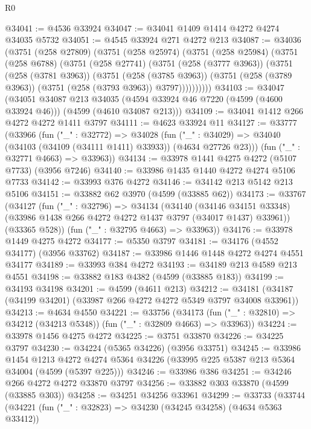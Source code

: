 \begin{lexlean}{R0}
\begin{coremodule}
@34041 := @4536 @33924
@34047 := @34041 @1409 @1414 @4272 @4274 @34035 @5732
@34051 := @4545 @33924 @271 @4272 @213
@34087 := @34036
    (@3751
      (@258 @27809)
      (@3751
        (@258 @25974)
        (@3751
          (@258 @25984)
          (@3751
            (@258 @6788)
            (@3751
              (@258 @27741)
              (@3751
                (@258 (@3777 @3963))
                (@3751
                  (@258 (@3781 @3963))
                  (@3751
                    (@258 (@3785 @3963))
                    (@3751 (@258 (@3789 @3963)) (@3751 (@258 (@3793 @3963)) @3797))))))))))
@34103 := @34047
    (@34051
      @34087
      @213
      @34035
      (@4594 @33924 @46 @7220 (@4599 (@4600 @33924 @46)))
      (@4599 (@4610 @34087 @213)))
@34109 := @34041 @1412 @266 @4272 @4272 @1411 @3797
@34111 := @4623 @33924 @11
@34127 := @33777
    (@33966
      (fun ("_" : @32772) =>
      @34028
        (fun ("_" : @34029) => @34040 (@34103 (@34109 (@34111 @1411) @33933)) (@4634 @27726 @23)))
      (fun ("_" : @32771 @4663) => @33963))
@34134 := @33978 @1441 @4275 @4272 (@5107 @7733) (@3956 @7246)
@34140 := @33986 @1435 @1440 @4272 @4274 @5106 @7733
@34142 := @33993 @376 @4272
@34146 := @34142 @213 @5142 @213 @5106
@34151 := @33882 @62 @3970 (@4599 (@33885 @62))
@34173 := @33767
    (@34127
      (fun ("_" : @32796) =>
      @34134
        (@34140
          (@34146 @34151 @33348)
          (@33986 @1438 @266 @4272 @4272 @1437 @3797 (@34017 @1437) @33961))
        (@33365 @528))
      (fun ("_" : @32795 @4663) => @33963))
@34176 := @33978 @1449 @4275 @4272
@34177 := @5350 @3797
@34181 := @34176 (@4552 @34177) (@3956 @33762)
@34187 := @33986 @1446 @1448 @4272 @4274 @4551 @34177
@34189 := @33993 @384 @4272
@34193 := @34189 @213 @4589 @213 @4551
@34198 := @33882 @183 @4382 (@4599 (@33885 @183))
@34199 := @34193 @34198
@34201 := @4599 (@4611 @213)
@34212 := @34181 (@34187 (@34199 @34201) (@33987 @266 @4272 @4272 @5349 @3797 @34008 @33961))
@34213 := @4634 @4550
@34221 := @33756
    (@34173 (fun ("_" : @32810) => @34212 (@34213 @5348)) (fun ("_" : @32809 @4663) => @33963))
@34224 := @33978 @1456 @4275 @4272
@34225 := @3751 @33870
@34226 := @34225 @3797
@34230 := @34224 (@5365 @34226) (@3956 @33751)
@34245 := @33986
    @1454
    @1213
    @4272
    @4274
    @5364
    @34226
    (@33995 @225 @5387 @213 @5364 @34004 (@4599 (@5397 @225)))
@34246 := @33986 @386
@34251 := @34246 @266 @4272 @4272 @33870 @3797
@34256 := @33882 @303 @33870 (@4599 (@33885 @303))
@34258 := @34251 @34256 @33961
@34299 := @33733
    (@33744
      (@34221
        (fun ("_" : @32823) => @34230 (@34245 @34258) (@4634 @5363 @33412))

\end{coremodule}
\end{lexlean}
